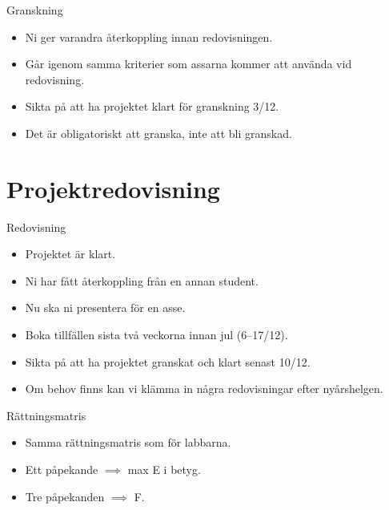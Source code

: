 \begin{frame}
  \begin{block}{Granskning}
    \begin{itemize}
      \item Ni ger varandra återkoppling innan redovisningen.
      \item Går igenom samma kriterier som assarna kommer att använda vid 
        redovisning.
      \item \alert{Sikta på att ha projektet klart för granskning 3/12.}
      \end{itemize}
  \end{block}

  \pause

  \begin{remark}
    \begin{itemize}
      \item Det är obligatoriskt att granska, inte att bli granskad.
    \end{itemize}
  \end{remark}
\end{frame}


\section{Projektredovisning}

\begin{frame}
  \begin{block}{Redovisning}
    \begin{itemize}
      \item Projektet är klart.
      \item Ni har fått återkoppling från en annan student.
      \item Nu ska ni presentera för en asse.
      \item Boka tillfällen sista två veckorna innan jul (6--17/12).
      \item \alert{Sikta på att ha projektet granskat och klart senast 10/12.}
    \end{itemize}
  \end{block}

  \pause

  \begin{remark}
    \begin{itemize}
      \item Om behov finns kan vi klämma in några redovisningar efter 
        nyårshelgen.
    \end{itemize}
  \end{remark}
\end{frame}

\begin{frame}
  \begin{block}{Rättningsmatris}
    \begin{itemize}
      \item Samma rättningsmatris som för labbarna.
      \item Ett påpekande \(\implies\) max E i betyg.
      \item Tre påpekanden \(\implies\) F.
    \end{itemize}
  \end{block}
\end{frame}

